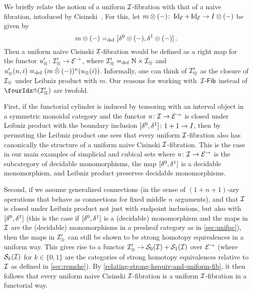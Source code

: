 \documentclass[reqno,10pt,a4paper,oneside,draft]{amsart}
\begin{document}
\begin{remark} \label{cisinski-remark}
We briefly relate the notion of a uniform $\cal{I}$-fibration with that of a naive fibration, intoduced by Cisinski~\cite{cisinski-asterisque}.
For this, let $m \otimes (-)  \co \Id_\catE + \Id_\catE \to \interval \otimes (-)$ be given by
\[
  m \otimes (-) \defeq [\lcyl \otimes (-), \rcyl \otimes (-)] \, .
\]
Then a uniform naive Cisinski $\cal{I}$-fibration would be defined as a right map for the functor $u_\otimes' \co \cal{I}_\otimes' \to \catE^\to$, where $\cal{I}_\otimes' \defeq \mathbb{N} \times \cal{I}_\otimes$ and $u_\otimes'(n, i) \defeq (m \hatotimes (-))^n(u_\otimes(i))$.
Informally, one can think of
$\cal{I}_\otimes'$ as the closure of $\cal{I}_\otimes$ under Leibniz product with $m$.
Our reasons for working with~$\Fib{\cal{I}}$ instead of $\liftr{(\cal{I}_\otimes')}$ are twofold.

First, if the functorial cylinder is induced by tensoring with an interval object in a symmetric monoidal category and the functor $u \co \cal{I} \to \catE^\to$ is closed under Leibniz product with the boundary inclusion $[\lcyl, \rcyl] \co 1 + 1 \to \interval$, then by permuting the Leibniz product one sees that every uniform $\cal{I}$-fibration also has canonically the structure of a uniform naive Cisinski $\cal{I}$-fibration.
This is the case in our main examples of simplicial and cubical sets where $u \co \cal{I} \to \catE^\to$ is the subcategory of decidable monomorphisms, the map $[\lcyl, \rcyl]$ is a decidable monomorphism, and Leibniz product preserves decidable monomorphisms.

Second, if we assume generalized connections (in the sense of $(1+n+1)$-ary operations that behave as connections for fixed middle $n$ arguments), and that $\cal{I}$ is closed under Leibniz product not just with endpoint inclusions, but also with $[\lcyl, \rcyl]$ (this is the case if $[\lcyl, \rcyl]$ is a (decidable) monomorphism and the maps in $\cal{I}$ are the (decidable) monomorphisms in a presheaf category as in \cref{sec:unifpc}), then the maps in $\cal{I}_\otimes'$ can still be shown to be strong homotopy equivalences in a uniform way.
This gives rise to a functor $\cal{I}_\otimes' \to \cal{S}_0(\cal{I}) + \cal{S}_1(\cal{I})$ over $\catE^\to$ (where $\cal{S}_k(\cal{I})$ for $k \in \{0,1\}$ are the categories of strong homotopy equivalences relative to $\cal{I}$ as defined in \cref{sec:remshe}).
By \cref{relating-strong-hequiv-and-uniform-fib}, it then follows that every uniform naive Cisinski $\cal{I}$-fibration is a uniform $\cal{I}$-fibration in a functorial way.
\end{remark}
\end{document}
